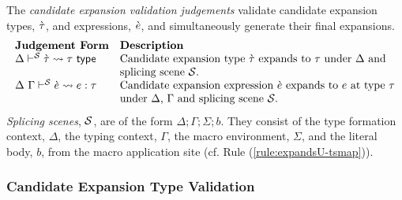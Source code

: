 The \emph{candidate expansion validation judgements} validate candidate expansion types, $\grave{\tau}$, and expressions, $\grave{e}$, and simultaneously generate their final expansions.
\[\begin{array}{ll}
\textbf{Judgement Form} & \textbf{Description}\\
\Delta\vdash^{\mathcal{S}} \grave{\tau} \leadsto \tau~\mathsf{type} & \text{Candidate expansion type $\grave{\tau}$ expands to $\tau$ under $\Delta$ and }\\
& \text{splicing scene $\mathcal{S}$.}\\
\Delta~\Gamma\vdash^{\mathcal{S}} \grave{e} \leadsto e : \tau & \text{Candidate expansion expression $\grave{e}$ expands to $e$ at type $\tau$}\\
& \text{under $\Delta$, $\Gamma$ and splicing scene $\mathcal{S}$.}
\end{array}\]
\emph{Splicing scenes}, $\mathcal{S}$, are of the form $\Delta; \Gamma; \Sigma; b$. They consist of the type formation context, $\Delta$, the typing context, $\Gamma$, the macro environment, $\Sigma$, and the literal body, $b$, from the macro application site (cf. Rule (\ref{rule:expandsU-tsmap})).

\subsubsection{Candidate Expansion Type Validation}

